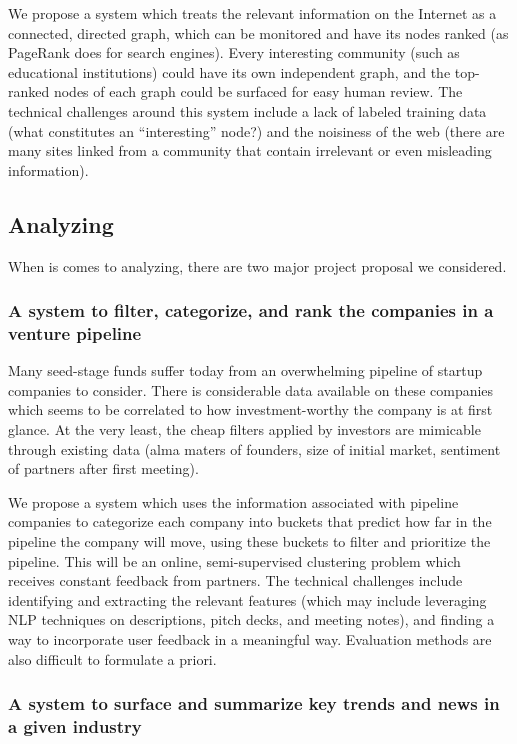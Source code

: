We propose a system which treats the relevant information on the Internet as a connected, directed graph, which can be monitored and have its nodes ranked (as PageRank does for search engines). Every interesting community (such as educational institutions) could have its own independent graph, and the top-ranked nodes of each graph could be surfaced for easy human review. The technical challenges around this system include a lack of labeled training data (what constitutes an ``interesting'' node?) and the noisiness of the web (there are many sites linked from a community that contain irrelevant or even misleading information).

\subsection{Analyzing}

When is comes to analyzing, there are two major project proposal we considered.

\subsubsection{A system to filter, categorize, and rank the companies in a venture pipeline}

Many seed-stage funds suffer today from an overwhelming pipeline of startup companies to consider. There is considerable data available on these companies which seems to be correlated to how investment-worthy the company is at first glance. At the very least, the cheap filters applied by investors are mimicable through existing data (alma maters of founders, size of initial market, sentiment of partners after first meeting).

We propose a system which uses the information associated with pipeline companies to categorize each company into buckets that predict how far in the pipeline the company will move, using these buckets to filter and prioritize the pipeline. This will be an online, semi-supervised clustering problem which receives constant feedback from partners. The technical challenges include identifying and extracting the relevant features (which may include leveraging NLP techniques on descriptions, pitch decks, and meeting notes), and finding a way to incorporate user feedback in a meaningful way. Evaluation methods are also difficult to formulate a priori.

\subsubsection{A system to surface and summarize key trends and news in a given industry}

